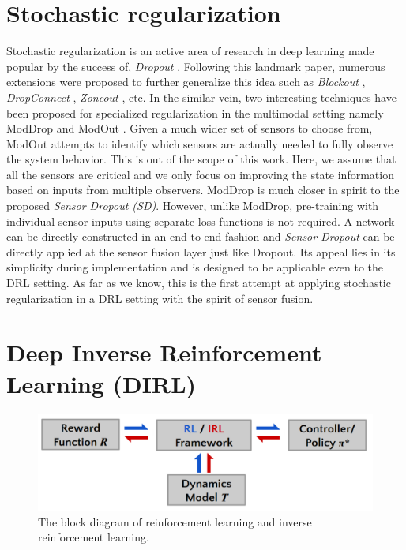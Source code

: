 \documentclass[../thesis.tex]{subfiles}
\begin{document}
\section{Stochastic regularization}

Stochastic regularization is an active area of research in deep learning made popular by the success of, \textit{Dropout} \cite{dropout}. Following this landmark paper, numerous extensions were proposed  to further generalize this idea such as \textit{Blockout} \cite{blockout}, \textit{DropConnect} \cite{dropconnect}, \textit{Zoneout} \cite{zoneout}, etc. In the similar vein, two interesting techniques have been proposed for specialized regularization in the multimodal setting namely ModDrop \cite{moddrop} and ModOut \cite{modout}. 
Given a much wider set of sensors to choose from, ModOut attempts to identify which sensors are actually needed to fully observe the system behavior. This is out of the scope of this work. Here, we assume that all the sensors are critical and we only focus on improving the state information based on inputs from multiple observers. 
ModDrop is much closer in spirit to the proposed \emph{Sensor Dropout (SD)}. However, unlike ModDrop, pre-training with individual sensor inputs using separate loss functions is not required. A network can be directly constructed in an end-to-end fashion and \emph{Sensor Dropout} can be directly applied at the sensor fusion layer just like Dropout. Its appeal lies in its simplicity during implementation and is designed to be applicable even to the DRL setting. As far as we know, this is the first attempt at applying stochastic regularization in a DRL setting with the spirit of sensor fusion. 



\section{Deep Inverse Reinforcement Learning (DIRL)} 
\label{sec:dirl_intro}


\begin{figure}[t]
	\begin{center}
		\centerline{\includegraphics[width=0.5\columnwidth]{./DIRL/fig/irl_rl_pipeline.png}}
		\caption{The block diagram of reinforcement learning and inverse reinforcement learning.}
		\label{fig:irl_rl}
	\end{center}
\end{figure} 
\end{document}
